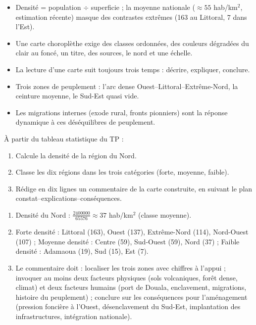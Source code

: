 \documentclass[11pt]{article}
\begin{document}
\begin{aretenir}[L'essentiel du TP 2]
\begin{itemize}
\item Densité = population $\div$ superficie ; la moyenne nationale ($\approx 55$ hab/km$^2$, estimation récente) masque des contrastes extrêmes (163 au Littoral, 7 dans l'Est).
\item Une carte choroplèthe exige des classes ordonnées, des couleurs dégradées du clair au foncé, un titre, des sources, le nord et une échelle.
\item La lecture d'une carte suit toujours trois temps : décrire, expliquer, conclure.
\item Trois zones de peuplement : l'arc dense Ouest--Littoral--Extrême-Nord, la ceinture moyenne, le Sud-Est quasi vide.
\item Les migrations internes (exode rural, fronts pionniers) sont la réponse dynamique à ces déséquilibres de peuplement.
\end{itemize}
\end{aretenir}

\begin{exercice}
À partir du tableau statistique du TP :
\begin{enumerate}
\item Calcule la densité de la région du Nord.
\item Classe les dix régions dans les trois catégories (forte, moyenne, faible).
\item Rédige en dix lignes un commentaire de la carte construite, en suivant le plan constat--explications--conséquences.
\end{enumerate}
\end{exercice}

\begin{corrige}[Exercice du TP 2]
\begin{enumerate}
\item Densité du Nord : $\frac{\num{2400000}}{\num{65576}} \approx 37$ hab/km$^2$ (classe moyenne).
\item Forte densité : Littoral (163), Ouest (137), Extrême-Nord (114), Nord-Ouest (107) ; Moyenne densité : Centre (59), Sud-Ouest (59), Nord (37) ; Faible densité : Adamaoua (19), Sud (15), Est (7).
\item Le commentaire doit : localiser les trois zones avec chiffres à l'appui ; invoquer au moins deux facteurs physiques (sols volcaniques, forêt dense, climat) et deux facteurs humains (port de Douala, enclavement, migrations, histoire du peuplement) ; conclure sur les conséquences pour l'aménagement (pression foncière à l'Ouest, désenclavement du Sud-Est, implantation des infrastructures, intégration nationale).
\end{enumerate}
\end{corrige}
\end{document}

